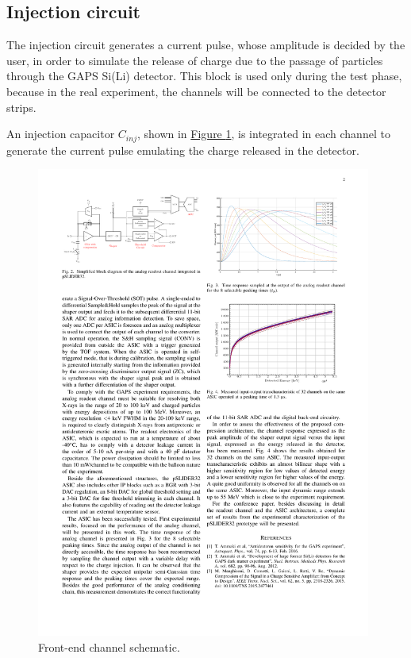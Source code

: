 
\subsection{Injection circuit}
The injection circuit generates a current pulse, whose amplitude is decided by the user, in order to simulate the release of charge due to the passage of particles through the GAPS Si(Li) detector. This block is used only during the test phase, because in the real experiment, the channels will be connected to the detector strips. 

\par
An injection capacitor $C_{inj}$, shown in \hyperref[figGAPSchannel]{Figure \ref{figGAPSchannel}}, is integrated in each channel to generate the current pulse emulating the charge released in the detector.

\begin{figure}[h!]
    \centering
    \includegraphics[width=0.98\textwidth]{Images/appendGAPSintro/readoutchannelADC.pdf}
    \caption{Front-end channel schematic.}
    \label{figGAPSchannel}
\end{figure}

